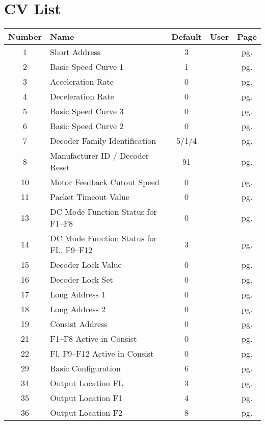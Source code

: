 \documentclass[12pt,letterpaper,draft]{memoir} %
\begin{document}
\chapter{CV List}

\begin{center}
\begin{longtable}{|c|l|c|c|c|}
\hline
Number&Name&Default&User&Page \\ \hline\hline
1&Short Address&3&&pg. \pageref{CV1} \\ \hline
2&Basic Speed Curve 1&1&&pg. \pageref{CV2} \\ \hline
3&Acceleration Rate&0&&pg. \pageref{CV3} \\ \hline
4&Deceleration Rate&0&&pg. \pageref{CV4} \\ \hline
5&Basic Speed Curve 3&0&&pg. \pageref{CV5} \\ \hline
6&Basic Speed Curve 2&0&&pg. \pageref{CV6} \\ \hline
7&Decoder Family Identification&5/1/4&&pg. \pageref{CV7} \\ \hline
8&Manufacturer ID / Decoder Reset&91&&pg. \pageref{CV8} \\ \hline
10&Motor Feedback Cutout Speed&0&&pg. \pageref{CV10} \\ \hline
11&Packet Timeout Value&0&&pg. \pageref{CV11} \\ \hline
13&DC Mode Function Status for F1--F8&0&&pg. \pageref{CV13} \\ \hline
14&DC Mode Function Status for FL, F9--F12&3&&pg. \pageref{CV14} \\ \hline
15&Decoder Lock Value&0&&pg. \pageref{CV15} \\ \hline
16&Decoder Lock Set&0&&pg. \pageref{CV16} \\ \hline
17&Long Address 1&0&&pg. \pageref{CV17} \\ \hline
18&Long Address 2&0&&pg. \pageref{CV18} \\ \hline
19&Consist Address&0&&pg. \pageref{CV19} \\ \hline
21&F1--F8 Active in Consist&0&&pg. \pageref{CV21} \\ \hline
22&Fl, F9--F12 Active in Consist&0&&pg. \pageref{CV22} \\ \hline
29&Basic Configuration&6&&pg. \pageref{CV29} \\ \hline
34&Output Location FL&3&&pg. \pageref{CV34} \\ \hline
35&Output Location F1&4&&pg. \pageref{CV35} \\ \hline
36&Output Location F2&8&&pg. \pageref{CV36} \\ \hline

\end{longtable}
\end{center}
\end{document}
